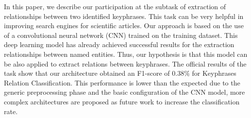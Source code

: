 In this paper, we describe our participation at the subtask of extraction of relationships between two identified keyphrases. This task can be very helpful in improving search engines for scientific articles. Our approach is based on the use of a convolutional neural network (CNN) trained on the training dataset. This deep learning model has already achieved successful results for the extraction relationships between named entities. Thus, our hypothesis is that this model can be also applied to extract relations between keyphrases. The official results of the task show that our architecture obtained an F1-score of 0.38\% for Keyphrases Relation Classification. This performance is lower than the expected due to the generic preprocessing phase and the basic configuration of the CNN model, more complex architectures are proposed as future work to increase the classification rate.

